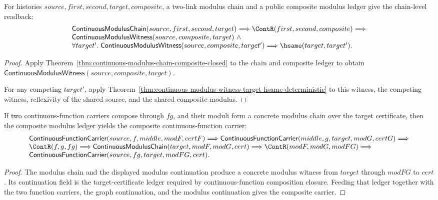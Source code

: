 \begin{theorem}
\label{thm:continuous-modulus-chain-composite-public-readback}
For histories $source,first,second,target,composite$, a two-link modulus chain
and a public composite modulus ledger give the chain-level readback:
$$
\begin{array}{l}
\mathsf{ContinuousModulusChain}(source,first,second,target)\Longrightarrow
\ContR(first,second,composite)\Longrightarrow
\\
\mathsf{ContinuousModulusWitness}(source,composite,target)\ \land\\
\forall target'.\;
\mathsf{ContinuousModulusWitness}(source,composite,target')\Longrightarrow
\hsame(target,target').
\end{array}
$$
\end{theorem}
\begin{proof}
Apply Theorem~\ref{thm:continuous-modulus-chain-composite-closed} to the chain
and composite ledger to obtain
$\mathsf{ContinuousModulusWitness}(source,composite,target)$.

For any competing $target'$, apply
Theorem~\ref{thm:continuous-modulus-witness-target-hsame-deterministic} to this
witness, the competing witness, reflexivity of the shared source, and the shared
composite modulus.
\end{proof}

\begin{theorem}
\label{thm:continuous-function-carrier-comp-modulus-chain-closed}
If two continuous-function carriers compose through $fg$, and their moduli form
a concrete modulus chain over the target certificate, then the composite
modulus ledger yields the composite continuous-function carrier:
$$
\begin{array}{l}
\mathsf{ContinuousFunctionCarrier}(source,f,middle,modF,certF)\Longrightarrow
\mathsf{ContinuousFunctionCarrier}(middle,g,target,modG,certG)\Longrightarrow
\\
\ContR(f,g,fg)\Longrightarrow
\mathsf{ContinuousModulusChain}(target,modF,modG,cert)\Longrightarrow
\ContR(modF,modG,modFG)\Longrightarrow
\\
\mathsf{ContinuousFunctionCarrier}(source,fg,target,modFG,cert).
\end{array}
$$
\end{theorem}
\begin{proof}
The modulus chain and the displayed modulus continuation produce a concrete
modulus witness from $target$ through $modFG$ to $cert$. Its continuation field
is the target-certificate ledger required by continuous-function composition
closure. Feeding that ledger together with the two function carriers, the graph
continuation, and the modulus continuation gives the composite carrier.
\end{proof}

